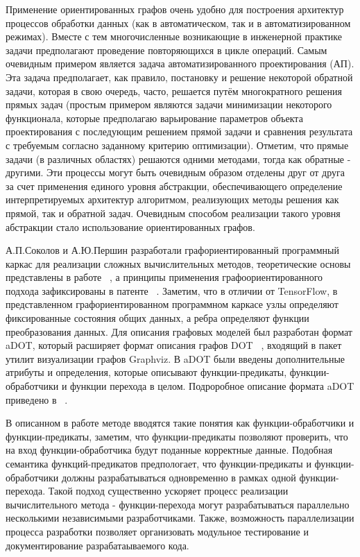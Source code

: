 Применение ориентированных графов очень удобно для построения архитектур процессов обработки данных (как в автоматическом, так и в автоматизированном режимах). Вместе с тем многочисленные возникающие в инженерной практике задачи предполагают проведение повторяющихся в цикле операций. Самым очевидным примером является задача автоматизированного проектирования (АП). Эта задача предполагает, как правило, постановку и решение некоторой обратной задачи, которая в свою очередь, часто, решается путём многократного решения прямых задач (простым примером являются задачи минимизации некоторого функционала, которые предполагаю варьирование параметров объекта проектирования с последующим решением прямой задачи и сравнения результата с требуемым согласно заданному критерию оптимизации). Отметим, что прямые задачи (в различных областях) решаются одними методами, тогда как обратные - другими. Эти процессы могут быть очевидным образом отделены друг от друга за счет применения единого уровня абстракции, обеспечивающего определение интерпретируемых архитектур  алгоритмом, реализующих методы решения как прямой, так и обратной задач. Очевидным способом реализации такого уровня абстракции стало использование ориентированных графов.

А.П.Соколов и А.Ю.Першин разработали графориентированный программный каркас для реализации сложных вычислительных методов, теоретические основы представлены в работе ~\cite{SokPersh2018GBSE}, а принципы применения графоориентированного подхода зафиксированы в патенте ~\cite{patentRU2681408}. Заметим, что в отличии от TensorFlow, в представленном графориентированном программном каркасе узлы определяют фиксированные состояния общих данных, а ребра определяют функции преобразования данных. Для описания графовых моделей был разработан формат aDOT, который расширяет формат описания графов DOT ~\cite{GraphsDOT}, входящий в пакет утилит визуализации графов Graphviz. В aDOT были введены дополнительные атрибуты и определения, которые описывают функции-предикаты, функции-обработчики и функции перехода в целом. Подроробное описание формата aDOT приведено в ~\cite{SokADOT}.

В описанном в работе методе вводятся такие понятия как функции-обработчики и функции-предикаты, заметим, что функции-предикаты позволяют проверить, что на вход функции-обработчика будут поданные корректные данные. Подобная семантика функций-предикатов предпологает, что функции-предикаты и функции-обработчики должны разрабатываться одновременно в рамках одной функции-перехода. Такой подход существенно ускоряет процесс реализации вычислительного метода - функции-перехода могут разрабатываться параллельно несколькими независимыми разработчиками. Также, возможность параллелизации процесса разработки позволяет организовать модульное тестирование и документирование разрабатаываемого кода. 


